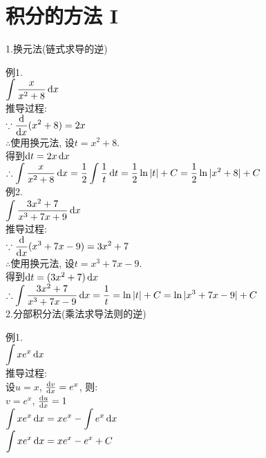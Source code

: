 \chapter{积分的方法 I}
1.换元法(链式求导的逆)
{\par\centering
{}
\par}
例1.\\[1ex]
$\displaystyle\int\frac{x}{x^2+8}\mathop{}\!\mathrm{d} x$\\[1ex]
推导过程:\\[1ex]
$\displaystyle\because\frac{\mathop{}\!\mathrm{d}}{\mathop{}\!\mathrm{d} x}(x^2+8)=2x$\\[1ex]
$\therefore$使用换元法, 设$t=x^2+8$.\\[1ex]
\phantom{$\therefore$}得到$\mathop{}\!\mathrm{d} t=2x\mathop{}\!\mathrm{d} x$\\[1ex]
$\therefore\displaystyle\int\frac{x}{x^2+8}\mathop{}\!\mathrm{d} x=\frac{1}{2}\int\frac{1}{t}\mathop{}\!\mathrm{d} t=\frac{1}{2}\ln|t|+C=\frac{1}{2}\ln|x^2+8|+C$\\[2ex]

例2.\\[1ex]
$\displaystyle\int\frac{3x^2+7}{x^3+7x+9}\mathop{}\!\mathrm{d} x$\\[1ex]
推导过程:\\[1ex]
$\displaystyle\because\frac{\mathop{}\!\mathrm{d}}{\mathop{}\!\mathrm{d} x}(x^3+7x-9)=3x^2+7$\\[1ex]
$\therefore$使用换元法, 设$t=x^3+7x-9$.\\[1ex]
\phantom{$\therefore$}得到$\mathop{}\!\mathrm{d} t=(3x^2+7)\mathop{}\!\mathrm{d} x$\\[1ex]
$\therefore\displaystyle\int\frac{3x^2+7}{x^3+7x-9}\mathop{}\!\mathrm{d} x=\frac{1}{t}=\ln|t|+C=\ln|x^3+7x-9|+C$\\[2ex]

2.分部积分法(乘法求导法则的逆)
{\par\centering
{}
\par}
例1.\\[1ex]
$\displaystyle\int xe^x\mathop{}\!\mathrm{d} x$\\[1ex]
推导过程:\\[1ex]
设$u=x$, $\frac{\mathop{}\!\mathrm{d} v}{\mathop{}\!\mathrm{d} x}=e^x$, 则:\\[1ex]
\phantom{设}$v=e^x$, $\frac{\mathop{}\!\mathrm{d} u}{\mathop{}\!\mathrm{d} x}=1$\\[1ex]
$\displaystyle\int xe^x\mathop{}\!\mathrm{d} x=xe^x-\int e^x\mathop{}\!\mathrm{d} x$\\[1ex]
$\displaystyle\int xe^x\mathop{}\!\mathrm{d} x=xe^x-e^x+C$\\[2ex]


